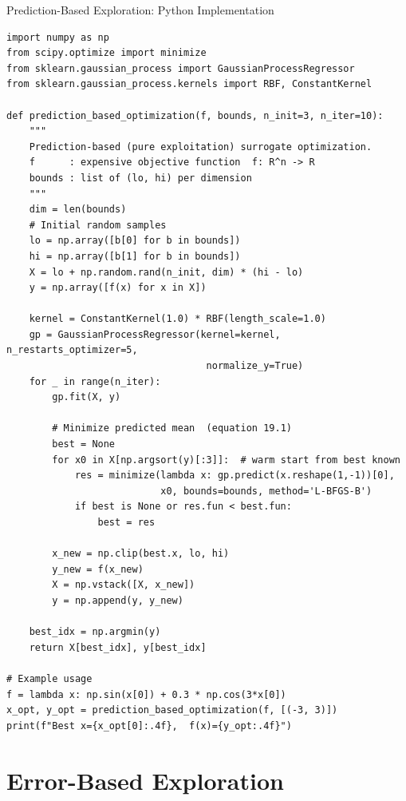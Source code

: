 \documentclass[aspectratio=169,10pt]{beamer}
\begin{document}
\begin{frame}[fragile]{Prediction-Based Exploration: Python Implementation}
\begin{lstlisting}[caption={Prediction-based surrogate optimization in Python}]
import numpy as np
from scipy.optimize import minimize
from sklearn.gaussian_process import GaussianProcessRegressor
from sklearn.gaussian_process.kernels import RBF, ConstantKernel

def prediction_based_optimization(f, bounds, n_init=3, n_iter=10):
    """
    Prediction-based (pure exploitation) surrogate optimization.
    f      : expensive objective function  f: R^n -> R
    bounds : list of (lo, hi) per dimension
    """
    dim = len(bounds)
    # Initial random samples
    lo = np.array([b[0] for b in bounds])
    hi = np.array([b[1] for b in bounds])
    X = lo + np.random.rand(n_init, dim) * (hi - lo)
    y = np.array([f(x) for x in X])

    kernel = ConstantKernel(1.0) * RBF(length_scale=1.0)
    gp = GaussianProcessRegressor(kernel=kernel, n_restarts_optimizer=5,
                                   normalize_y=True)
    for _ in range(n_iter):
        gp.fit(X, y)

        # Minimize predicted mean  (equation 19.1)
        best = None
        for x0 in X[np.argsort(y)[:3]]:  # warm start from best known
            res = minimize(lambda x: gp.predict(x.reshape(1,-1))[0],
                           x0, bounds=bounds, method='L-BFGS-B')
            if best is None or res.fun < best.fun:
                best = res

        x_new = np.clip(best.x, lo, hi)
        y_new = f(x_new)
        X = np.vstack([X, x_new])
        y = np.append(y, y_new)

    best_idx = np.argmin(y)
    return X[best_idx], y[best_idx]

# Example usage
f = lambda x: np.sin(x[0]) + 0.3 * np.cos(3*x[0])
x_opt, y_opt = prediction_based_optimization(f, [(-3, 3)])
print(f"Best x={x_opt[0]:.4f},  f(x)={y_opt:.4f}")
\end{lstlisting}
\end{frame}

\section{Error-Based Exploration}
\end{document}
